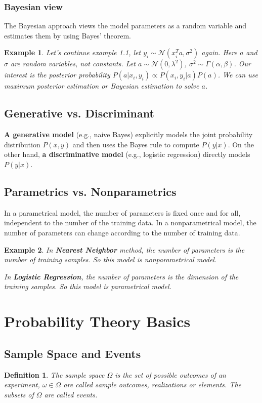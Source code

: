 \documentclass[11pt]{article}
\def\MN{{\mathcal N}}
\newtheorem{definition}{Definition}[section]
\newtheorem{example}{Example}[section]
\begin{document}
\subsubsection{Bayesian view}
The Bayesian approach views the model parameters as a random variable and  estimates them by using Bayes' theorem.

\begin{example}
Let's continue example 1.1, let $y_i \sim \MN(x_i^T a, \sigma^2)$ again. Here $a$ and $\sigma$ are random variables, not constants. Let $a \sim \MN(0, \lambda^2)$, $\sigma^2 \sim \Gamma(\alpha, \beta)$.
Our interest is the posterior probability $P(a|x_i, y_i) \propto P(x_i, y_i|a)P(a)$. We can use maximum posterior estimation or Bayesian estimation to solve $a$.
\end{example}


\subsection{Generative vs. Discriminant}
\textbf{A generative model} (e.g., naive Bayes) explicitly models the joint probability distribution $P(x,y)$ and then uses the Bayes rule to compute $P(y|x)$. On the other hand, \textbf{a discriminative model} (e.g., logistic regression) directly models $P(y|x)$.
\subsection{Parametrics vs. Nonparametrics}
In a parametrical model, the number of parameters is fixed once and for all, independent to the number of the training data.
In a nonparametrical model, the number of parameters can change according to the number of training data.

\begin{example}
In \textbf{Nearest Neighbor} method, the number of parameters is the number of training samples. So this model is nonparametrical model.

In \textbf{Logistic Regression}, the number of parameters is the dimension of the training samples. So this model is parametrical model.
\end{example}

\section{Probability Theory Basics}
\subsection{Sample Space and Events}
\begin{definition}
The \textit{sample space} $\Omega$ is the set of possible outcomes of an experiment,
$\omega \in \Omega$ are called sample outcomes, realizations or elements.
The subsets of $\Omega$ are called \textit{events}.
\end{definition}
\end{document}
